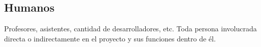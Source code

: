 \subsection{Humanos}
Profesores, asistentes, cantidad de desarrolladores, etc. Toda persona involucrada directa o indirectamente en el proyecto y sus funciones dentro de él.
